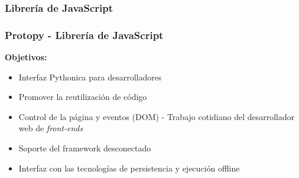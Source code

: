 \documentclass{beamer}
\begin{document}
\subsubsection{Librería de JavaScript}
\begin{frame}
    \frametitle{Protopy - Librería de JavaScript}
    
            {\bf Objetivos:}\par
                \begin{itemize}
                        \item{Interfaz Pythonica para desarrolladores}
                        \item{Promover la reutilización de código}
                        \item{Control de la página y eventos (DOM) - Trabajo
                        cotidiano del desarrollador web de {\it front-ends}}
                        \item{Soporte del framework desconectado}
                        \item{Interfaz con las tecnologías de persistencia y
                        ejecución offline} 
                \end{itemize}     
         
\end{frame}    
      
\end{document}
